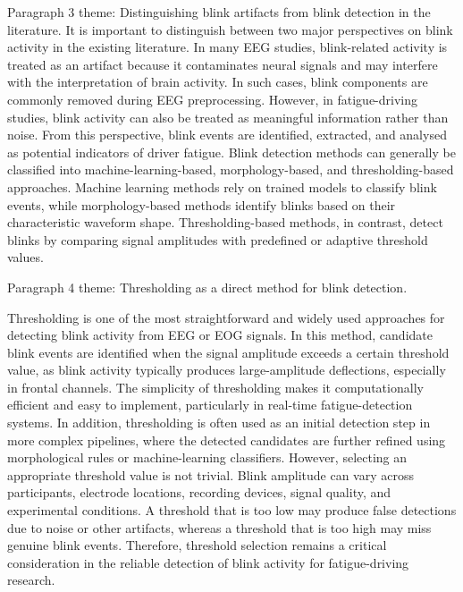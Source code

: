Paragraph 3 theme: Distinguishing blink artifacts from blink detection in the literature.
It is important to distinguish between two major perspectives on blink activity in the existing literature. In many EEG studies, blink-related activity is treated as an artifact because it contaminates neural signals and may interfere with the interpretation of brain activity. In such cases, blink components are commonly removed during EEG preprocessing. However, in fatigue-driving studies, blink activity can also be treated as meaningful information rather than noise. From this perspective, blink events are identified, extracted, and analysed as potential indicators of driver fatigue. Blink detection methods can generally be classified into machine-learning-based, morphology-based, and thresholding-based approaches. Machine learning methods rely on trained models to classify blink events, while morphology-based methods identify blinks based on their characteristic waveform shape. Thresholding-based methods, in contrast, detect blinks by comparing signal amplitudes with predefined or adaptive threshold values.

Paragraph 4 theme: Thresholding as a direct method for blink detection.

Thresholding is one of the most straightforward and widely used approaches for detecting blink activity from EEG or EOG signals. In this method, candidate blink events are identified when the signal amplitude exceeds a certain threshold value, as blink activity typically produces large-amplitude deflections, especially in frontal channels. The simplicity of thresholding makes it computationally efficient and easy to implement, particularly in real-time fatigue-detection systems. In addition, thresholding is often used as an initial detection step in more complex pipelines, where the detected candidates are further refined using morphological rules or machine-learning classifiers. However, selecting an appropriate threshold value is not trivial. Blink amplitude can vary across participants, electrode locations, recording devices, signal quality, and experimental conditions. A threshold that is too low may produce false detections due to noise or other artifacts, whereas a threshold that is too high may miss genuine blink events. Therefore, threshold selection remains a critical consideration in the reliable detection of blink activity for fatigue-driving research.


